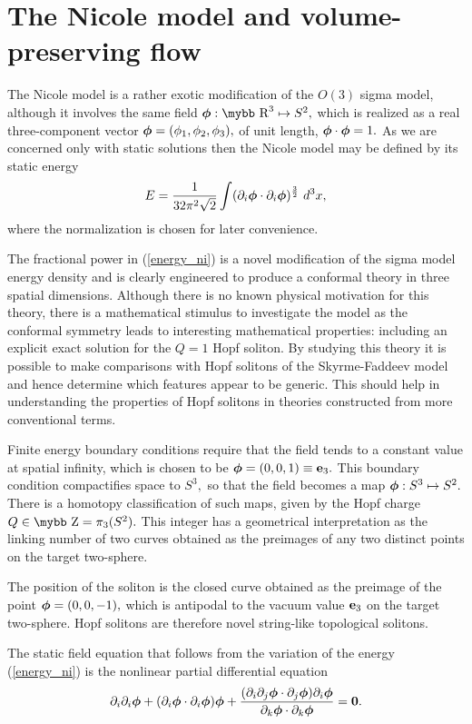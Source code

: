 \documentclass[12pt]{article}
\newcommand{\be}{\begin{equation}}
\newcommand{\ee}{\end{equation}}
\newcommand{\bphi}{\mbox{\boldmath $\phi$}}
\def\bb#1{\hbox{\mybb#1}}
\newcommand{\news}{\setcounter{equation}{0}\quad}
\begin{document}
\section{The Nicole model and volume-preserving flow}\news
The Nicole model \cite{Ni} is a rather exotic 
modification of the $O(3)$ sigma model, although it involves the 
same field $\bphi:\bb{R}^3\mapsto S^2,$ which is realized as a 
real three-component
vector $\bphi=(\phi_1,\phi_2,\phi_3),$ of unit length,
$\bphi\cdot\bphi=1.$ 
As we are concerned only with static solutions then the Nicole model
may be defined by its static energy
\be
E=\frac{1}{32\pi^2\sqrt{2}}\int (\partial_i\bphi\cdot\partial_i\bphi)
^\frac{3}{2}\ d^3x, \label{energy_ni}
\ee
where the normalization is chosen for later convenience.

The fractional power in (\ref{energy_ni}) is a novel modification
of the sigma model energy density and is clearly engineered to produce a 
conformal theory in three spatial dimensions. 
Although there is no known physical motivation for this theory,
there is a mathematical stimulus to investigate the model as
the conformal symmetry leads to interesting mathematical properties:
including an explicit exact solution for the $Q=1$ Hopf soliton.
By studying this theory it is possible to make comparisons with
Hopf solitons of the Skyrme-Faddeev model and hence determine
which features appear to be generic. This should help in 
understanding the properties of Hopf solitons in theories 
constructed from more conventional terms. 

 Finite energy boundary conditions require that the field tends to a
constant value at spatial infinity, which is chosen to be
$\bphi=(0,0,1)\equiv{\bf e}_3.$  This boundary condition
compactifies space to $S^3,$ so that the field becomes a map $\bphi:
S^3\mapsto S^2.$ 
There is a homotopy classification of such maps, given by the Hopf charge 
$Q\in\bb{Z}=\pi_3(S^2).$ This integer has a geometrical interpretation
as the linking number of two curves obtained as the preimages
of any two distinct points on the target two-sphere.

The position of the soliton is the closed curve obtained as the preimage of the
point $\bphi=(0,0,-1),$ which is
antipodal to the vacuum value ${\bf e}_3$ on the target two-sphere.
Hopf solitons are therefore novel string-like topological solitons.

The static field equation that follows from the variation of the energy
(\ref{energy_ni}) is the 
nonlinear partial differential equation
\be
\partial_i\partial_i\bphi
+(\partial_i\bphi\cdot\partial_i\bphi)\bphi
+\frac{(\partial_i\partial_j\bphi\cdot\partial_j\bphi)\partial_i\bphi}
{\partial_k\bphi\cdot\partial_k\bphi}={\bf 0}.
\label{eom_ni}
\ee
\end{document}
